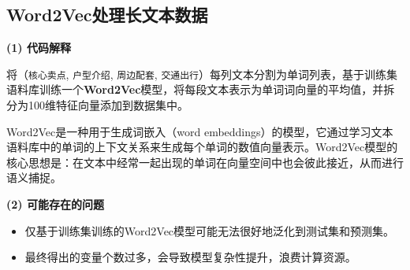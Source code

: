 \documentclass[
    report,     %
    oneside,    %
    UTF8,       %
    zihao=-4    %
]{config} %
\begin{document}
\subsection{Word2Vec处理长文本数据}

\textbf{(1) 代码解释}

将（\lstinline|核心卖点|, \lstinline|户型介绍|, \lstinline|周边配套|, \lstinline|交通出行|）每列文本分割为单词列表，基于训练集语料库训练一个\textbf{Word2Vec}模型，将每段文本表示为单词词向量的平均值，并拆分为100维特征向量添加到数据集中。

Word2Vec是一种用于生成词嵌入（word embeddings）的模型，它通过学习文本语料库中的单词的上下文关系来生成每个单词的数值向量表示。Word2Vec模型的核心思想是：在文本中经常一起出现的单词在向量空间中也会彼此接近，从而进行语义捕捉。

\textbf{(2) 可能存在的问题}

\begin{itemize}
    \item 仅基于训练集训练的Word2Vec模型可能无法很好地泛化到测试集和预测集。
    \item 最终得出的变量个数过多，会导致模型复杂性提升，浪费计算资源。
\end{itemize}
\end{document}
